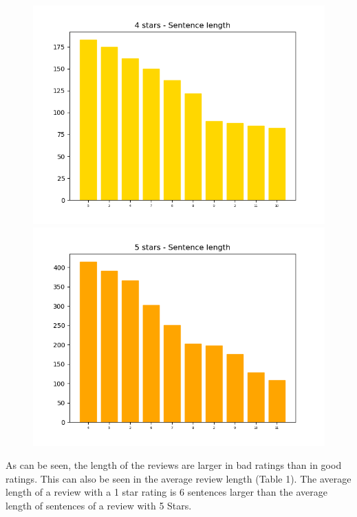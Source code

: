 \begin{figure}
		\includegraphics[scale=0.3]{figures/4stars-Sentencelength.png}
		\includegraphics[scale=0.3]{figures/5stars-Sentencelength.png}
	\end{figure}
As can be seen, the length of the reviews are larger in bad ratings than in good ratings. This can also be seen in the average review length (Table 1). The average length of a review with a 1 star rating is 6 sentences larger than the average length of sentences of a review with 5 Stars. 
	